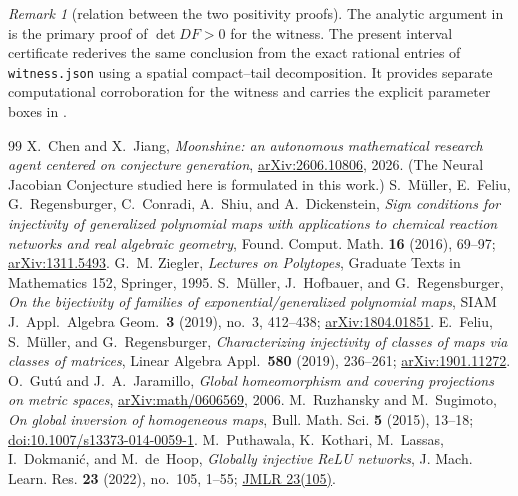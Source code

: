 \documentclass[11pt,twoside,leqno]{article}
\theoremstyle{plain}
\theoremstyle{definition}
\theoremstyle{remark}
\newtheorem{remark}[remark]{Remark}
\begin{document}
\begin{remark}[relation between the two positivity proofs]\label{rmk:companion-det}
The analytic argument in  is the primary proof of $\det DF>0$ for the witness.  The present interval certificate rederives the same conclusion from the exact rational entries of \texttt{witness.json} using a spatial compact--tail decomposition.  It provides separate computational corroboration for the witness and carries the explicit parameter boxes in .
\end{remark}

\begin{sloppypar}
\raggedright
\begin{thebibliography}{99}
 X.~Chen and X.~Jiang, \emph{Moonshine: an autonomous mathematical research agent centered on conjecture generation}, \href{https://arxiv.org/abs/2606.10806}{arXiv:2606.10806}, 2026. (The Neural Jacobian Conjecture studied here is formulated in this work.)
 S.~M\"uller, E.~Feliu, G.~Regensburger, C.~Conradi, A.~Shiu, and A.~Dickenstein, \emph{Sign conditions for injectivity of generalized polynomial maps with applications to chemical reaction networks and real algebraic geometry}, Found. Comput. Math. \textbf{16} (2016), 69--97; \href{https://arxiv.org/abs/1311.5493}{arXiv:1311.5493}.
 G.~M. Ziegler, \emph{Lectures on Polytopes}, Graduate Texts in Mathematics 152, Springer, 1995.
 S.~M\"uller, J.~Hofbauer, and G.~Regensburger, \emph{On the bijectivity of families of exponential/generalized polynomial maps}, SIAM J.\ Appl.\ Algebra Geom.\ \textbf{3} (2019), no.~3, 412--438; \href{https://arxiv.org/abs/1804.01851}{arXiv:1804.01851}.
 E.~Feliu, S.~M\"uller, and G.~Regensburger, \emph{Characterizing injectivity of classes of maps via classes of matrices}, Linear Algebra Appl.\ \textbf{580} (2019), 236--261; \href{https://arxiv.org/abs/1901.11272}{arXiv:1901.11272}.
 O.~Gut\'u and J.~A.~Jaramillo, \emph{Global homeomorphism and covering projections on metric spaces}, \href{https://arxiv.org/abs/math/0606569}{arXiv:math/0606569}, 2006.
 M.~Ruzhansky and M.~Sugimoto, \emph{On global inversion of homogeneous maps}, Bull. Math. Sci. \textbf{5} (2015), 13--18; \href{https://doi.org/10.1007/s13373-014-0059-1}{doi:10.1007/s13373-014-0059-1}.
 M.~Puthawala, K.~Kothari, M.~Lassas, I.~Dokmani\'c, and M.~de~Hoop, \emph{Globally injective ReLU networks}, J. Mach. Learn. Res. \textbf{23} (2022), no.~105, 1--55; \href{https://www.jmlr.org/papers/v23/21-0282.html}{JMLR 23(105)}.

\end{thebibliography}
\end{sloppypar}
\end{document}
